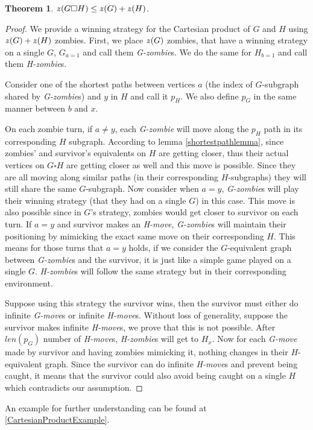 \documentclass[1p]{elsarticle}
\newtheorem{theorem}{Theorem}
\newcommand{\zn}{\ooalign{$z$\cr\hfil\rule[.5ex]{.2em}{.08ex}\hfil\cr}}
\begin{document}
\begin{theorem}
	\label{T2}
	$\zn(G \square H) \leq \zn(G) + \zn(H)$.
\end{theorem}

\begin{proof}
	We provide a winning strategy for the Cartesian product of $G$ and $H$ using $\zn(G)+\zn(H)$ zombies. First, we place
	$\zn(G)$ zombies, that have a winning strategy on a single $G$, $G_{a = 1}$ and call them {\it G-zombie}s. We do the
	same for $H_{b = 1}$ and call them {\it H-zombie}s.


	Consider one of the shortest paths between vertices $a$ (the index of $G$-subgraph shared by {\it G-zombie}s) and
	$y$ in $H$ and call it $p_H$. We also define $p_G$ in the same manner between $b$ and $x$.


	On each zombie turn, if $a \neq y$, each {\it G-zombie} will move along the $p_H$ path in its corresponding $H$
	subgraph. According to lemma \ref{shortestpathlemma}, since zombies' and survivor's equivalents on $H$ are getting
	closer, thus their actual vertices on $G \square H$ are getting closer as well and this move is possible. Since they
	are all moving along similar paths (in their corresponding $H$-subgraphs) they will still share the same
	$G$-subgraph. Now consider when $a = y$, {\it G-zombie}s will play their winning strategy (that they had on a single
	$G$) in this case. This move is also possible since in $G$'s strategy, zombies would get closer to survivor on each
	turn. If $a = y$ and survivor makes an {\it H-move}, {\it G-zombie}s will maintain their positioning by mimicking
	the exact same move on their corresponding $H$. This means for those turns that $a=y$ holds, if we consider the
	$G$-equivalent graph between {\it G-zombie}s and the survivor, it is just like a simple game played on a single $G$.
	{\it H-zombie}s will follow the same strategy but in their corresponding environment.
	
	
	Suppose using this strategy the survivor wins, then the survivor must either do infinite {\it G-move}s or infinite
	{\it H-move}s. Without loss of generality, suppose the survivor makes infinite {\it H-move}s, we prove that this is
	not possible. After $len(p_G)$ number of {\it H-move}s, {\it H-zombie}s will get to $H_x$. Now for each {\it G-move}
	made by survivor and having zombies mimicking it, nothing changes in their $H$-equivalent graph. Since the survivor
	can do infinite {\it H-move}s and prevent being caught, it means that the survivor could also avoid being caught on
	a single $H$ which contradicts our assumption.
	
\end{proof}
An example for further understanding can be found at \ref{CartesianProductExample}.
\end{document}
